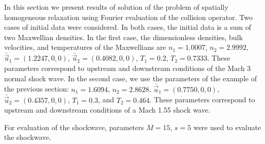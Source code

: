 \documentclass[12pt]{CSUNthesis}
\begin{document}
In this section we present results of solution of the problem of 
spatially homogeneous relaxation using Fourier evaluation of the 
collision operator. Two cases of initial data were considered. In 
both cases, the initial data is a sum of two Maxwellian densities. 
In the first case, the 
dimensionless densities, bulk velocities, and temperatures of the 
Maxwellians are $n_1=1.0007$, $n_2=2.9992$, 
$\bar{\vec{u}}_{1}=(1.2247,0,0)$, $\bar{\vec{u}}_{2}=(0.4082,0,0)$,
$T_{1}=0.2$, $T_{2}=0.7333$. These parameters correspond to upstream 
and downstream conditions of the Mach 3 normal shock wave.  
In the second case, we use the parameters of the example of the previous  
section: $n_{1}=1.6094$, $n_{2}=2.8628$, $\bar{\vec{u}}_{1}=(0.7750,0,0)$, $\bar{\vec{u}}_{2}=(0.4357,0,0)$, $T_{1}=0.3$, and $T_{2}=0.464$. These 
parameters correspond to upstream and downstream conditions of a Mach 1.55 
shock wave. 

For evaluation of the shockwave, parameters $M=15$, $s=5$ were used to evaluate the shockwave. 
\end{document}
